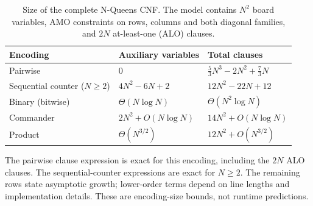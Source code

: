 \begin{table}[t]
\centering
\caption{Size of the complete N-Queens CNF. The model contains $N^2$ board variables,
AMO constraints on rows, columns and both diagonal families, and $2N$ at-least-one (ALO) clauses.}
\label{tab:cnf-size}
\small
\begin{tabular}{@{}lll@{}}
\toprule
Encoding & Auxiliary variables & Total clauses \\
\midrule
Pairwise
  & $0$
  & $\frac{5}{3}N^3-2N^2+\frac{7}{3}N$ \\
Sequential counter ($N\ge 2$)
  & $4N^2-6N+2$
  & $12N^2-22N+12$ \\
Binary (bitwise)
  & $\Theta(N\log N)$
  & $\Theta(N^2\log N)$ \\
Commander
  & $2N^2+O(N\log N)$
  & $14N^2+O(N\log N)$ \\
Product
  & $\Theta(N^{3/2})$
  & $12N^2+O(N^{3/2})$ \\
\bottomrule
\end{tabular}

\vspace{2pt}
\begin{minipage}{0.96\linewidth}
\footnotesize
The pairwise clause expression is exact for this encoding, including the $2N$ ALO clauses. The sequential-counter expressions are exact for $N\ge2$. The remaining rows state asymptotic growth; lower-order terms depend on line lengths and implementation details. These are encoding-size bounds, not runtime predictions.
\end{minipage}
\end{table}
